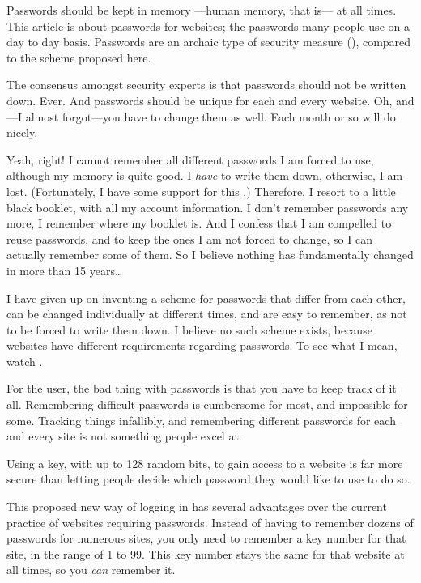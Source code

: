 Passwords should be kept in memory%
---human memory, that is---%
at all times.
This article is about passwords for websites; the passwords many people use on a day to day basis.
Passwords are an archaic type of security measure
(\cite{Honan2012}),
compared to the scheme proposed here.

The consensus amongst security experts is that passwords should not be written down.
Ever.
And passwords should be unique for each and every website.
Oh, and---I almost forgot---you have to change them as well.
Each month or so will do nicely. 
\par
Yeah, right!
I cannot remember all different passwords I am forced to use, although my memory is quite good.
I \emph{have} to write them down,
	otherwise,
		I am lost.
(Fortunately,
	I have some support for this \cite{Schneier:2005}.)
Therefore,
	I resort to a little black booklet,
		with all my account information.
I don't remember passwords any more,
	I remember where my booklet is.
And I confess that I am compelled to reuse passwords,
	and to keep the ones I am not forced to change,
		so I can actually remember some of them.
So I believe nothing has fundamentally changed in more than 15 years\ldots\cite{Adams:1999:UE:322796.322806}
\par
I have given up on inventing a scheme for passwords that differ from each other,
can be changed individually at different times, 
and are easy to remember, as not to be forced to write them down.
I believe no such scheme exists, because websites have different requirements regarding passwords.
To see what I mean, watch \cite{youtube:tobyturner}.
\par
For the user, the bad thing with passwords is that you have to keep track of it all.
Remembering difficult passwords is cumbersome for most, and impossible for some.
Tracking things infallibly, and remembering different passwords for each and every site is not something people excel at.

Using a key,
with up to 128 random bits,
to gain access to a website is far more secure than letting people decide which password they would like to use to do so.
\par
This proposed new way of logging in has several advantages over the current practice of websites requiring passwords.
Instead of having to remember dozens of passwords for numerous sites,
you only need to remember a key number for that site, in the range of 1 to 99.
This key number stays the same for that website at all times, so you \emph{can} remember it.
